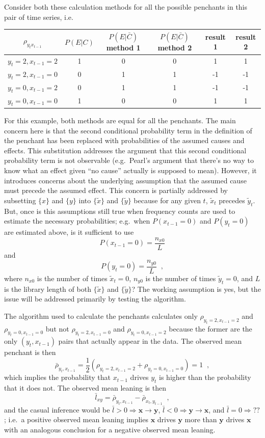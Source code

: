 \documentclass[a4paper,11pt,twocolumn]{article}
\begin{document}
Consider both these calculation methods for all the possible penchants in this pair of time series, i.e.\
\begin{center}
\begin{tabular}{c|c|c|c|c|c}
$\rho_{y_{t}x_{t-1}}$ & $P(E|C)$ & $P(E|\bar{C})$ method 1 & $P(E|\bar{C})$ method 2 & result 1 & result 2\\
\hline
 $y_{t}=2,x_{t-1}=2$& 1 & 0 & 0 & 1 & 1\\
 $y_{t}=2,x_{t-1}=0$& 0 & 1 & 1 & -1 & -1\\
 $y_{t}=0,x_{t-1}=2$& 0 & 1 & 1 & -1 & -1\\
 $y_{t}=0,x_{t-1}=0$& 1 & 0 & 0 & 1 & 1
\end{tabular}
\end{center}
For this example, both methods are equal for all the penchants.  The main concern here is that the second conditional probability term in the definition of the penchant has been replaced with probabilities of the assumed causes and effects.  This substitution addresses the argument that this second conditional probability term is not observable (e.g.\ Pearl's argument that there's no way to know what an effect given ``no cause'' actually is supposed to mean).  However, it introduces concerns about the underlying assumption that the assumed cause must precede the assumed effect.  This concern is partially addressed by subsetting $\{x\}$ and $\{y\}$ into $\{\tilde{x}\}$ and $\{\tilde{y}\}$ because for any given $t$, $\tilde{x}_t$ precedes $\tilde{y}_t$.  But, once is this assumptions still true when frequency counts are used to estimate the necessary probabilities; e.g.\ when $P(x_{t-1}=0)$ and $P(y_t=0)$ are estimated above, is it sufficient to use   
$$
P(x_{t-1}=0) = \frac{n_{x0}}{L}
$$ 
and 
$$
P(y_t=0) = \frac{n_{y0}}{L}\;\;,
$$
where $n_{x0}$ is the number of times $\tilde{x}_t = 0$, $n_{y0}$ is the number of times $\tilde{y}_t = 0$, and $L$ is the library length of both $\{\tilde{x}\}$ and $\{\tilde{y}\}$?  The working assumption is yes, but the issue will be addressed primarily by testing the algorithm.

The algorithm used to calculate the penchants calculates only $\rho_{y_{t}=2,x_{t-1}=2}$ and $\rho_{y_{t}=0,x_{t-1}=0}$ but not $\rho_{y_{t}=2,x_{t-1}=0}$ and $\rho_{y_{t}=0,x_{t-1}=2}$ because the former are the only $(y_{t},x_{t-1})$ pairs that actually appear in the data.  The observed mean penchant is then 
$$
\bar{\rho}_{y_{t},x_{t-1}} = \frac{1}{2}\left( \rho_{y_{t}=2,x_{t-1}=2} + \rho_{y_{t}=0,x_{t-1}=0} \right) = 1\;\;,
$$
which implies the probability that $x_{t-1}$ drives $y_{t}$ is higher than the probability that it does not.  The observed mean leaning is then
$$
\bar{l}_{xy} = \bar{\rho}_{y_{t},x_{t-1}} - \bar{\rho}_{x_{t},y_{t-1}}\;\;,
$$
and the casual inference would be $\bar{l}>0\Rightarrow \mathbf{x}\rightarrow\mathbf{y}$, $\bar{l}<0\Rightarrow \mathbf{y}\rightarrow\mathbf{x}$, and $\bar{l}=0\Rightarrow ??$; i.e.\ a positive observed mean leaning implies $\mathbf{x}$ drives $\mathbf{y}$ more than $\mathbf{y}$ drives $\mathbf{x}$ with an analogous conclusion for a negative observed mean leaning.   
\end{document}
